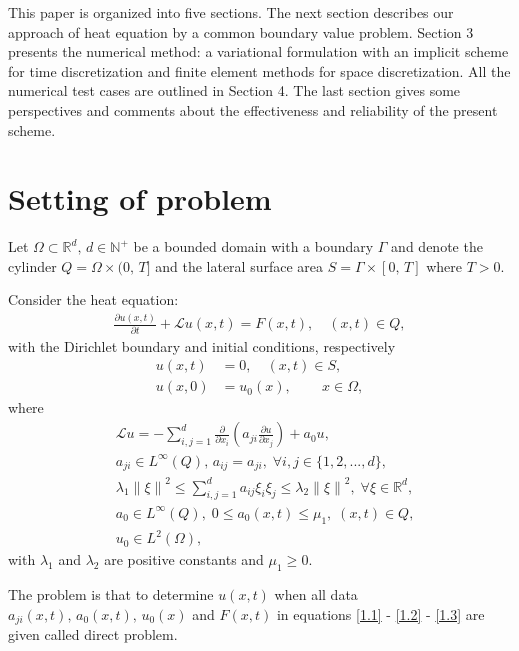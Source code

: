 \documentclass[twocolumn]{article}
\begin{document}
This paper is organized into five sections. The next section 
describes our approach of heat equation by a common boundary value problem. Section 3 presents the numerical method: a variational formulation with an implicit scheme for time discretization and finite element methods for space discretization. All the numerical test cases are outlined in Section 4.  The last section gives some perspectives and comments about the effectiveness and reliability of the present scheme.
\section{Setting of problem}
\quad Let $\Omega \subset \mathbb{R}^d,\, d\in \mathbb{N^+}$ be a bounded domain with a boundary $\Gamma$ and denote the cylinder $Q=\Omega\times (0,\, T]$ and the lateral surface area $S=\Gamma \times [0,\, T]$ where $T>0$. 

Consider the heat equation:
\begin{align}\label{1.1}
	\frac{\partial u(x, t)}{\partial t}+\mathcal{L}u(x, t)=F(x, t), \quad(x, t)\in Q,
\end{align}
with the Dirichlet boundary and initial conditions, respectively
\begin{align}
	u(x, t)&=0,\quad(x, t)\in S, \label{1.2}\\
	u(x, 0)&=u_0(x),\quad\quad\, x\in \Omega,\label{1.3}
\end{align}
where
\begin{align*}
	&\mathcal{L}u = -\sum_{i, j=1}^{d}\frac{\partial}{\partial x_i}\left(a_{ji}\frac{\partial u}{\partial x_j}\right)+a_0u,\\
	&a_{ji}\in L^{\infty}(Q),\, a_{ij}=a_{ji},\; \forall i, j\in \{1, 2, ..., d\},\\
	&\lambda_1\left\|\xi\right\|^2\leq \sum_{i, j=1}^{d}a_{ij}\xi_i\xi_j\leq \lambda_2\left\|\xi\right\|^2,\; \forall \xi\in\mathbb{R}^d,\\
	&a_0\in L^{\infty}(Q),\; 0\leq a_0(x, t)\leq \mu_1,\; (x, t)\in Q,\\ 
	&u_0\in L^2(\Omega),%
\end{align*}
with $\lambda_1$ and $\lambda_2$ are positive constants and $\mu_1\geq 0$. 

The problem is that to determine $u(x, t)$ when all data $a_{ji}(x, t),\,a_0(x, t),\,u_0(x)$ and $F(x, t)$ in equations \eqref{1.1} - \eqref{1.2} - \eqref{1.3} are given called direct problem.
\end{document}
